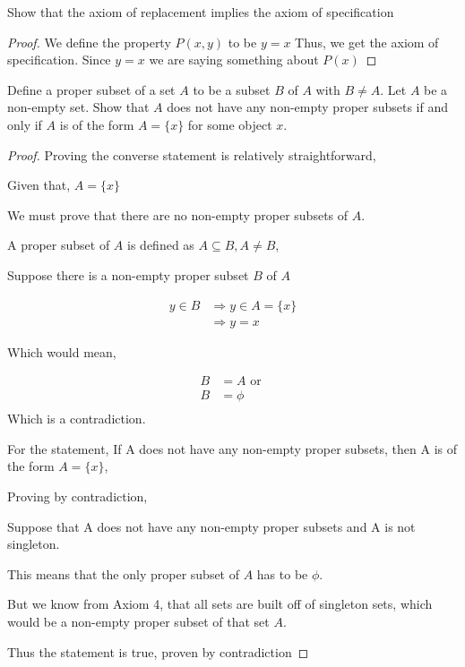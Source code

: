 \documentclass[11pt]{report}
\begin{document}
\begin{prop}
	Show that the axiom of replacement implies the axiom of specification
\end{prop}
\begin{proof}
	We define the property $P(x,y)$ to be $y=x$ Thus, we get the axiom of specification.
	Since $y=x$ we are saying something about $P(x)$
\end{proof}
\begin{prop}
	Define a proper subset of a set $A$ to be a subset $B$ of $A$ with $B \neq A$. Let $A$ be a non-empty set. Show that $A$ does not have any non-empty proper subsets if and only if $A$ is of the form $A = \{x\}$ for some object $x$.
\end{prop}
\begin{proof}

	Proving the converse statement is relatively straightforward,

	Given that,
	$A = \{x\}$

	We must prove that there are no non-empty proper subsets of $A$.

	A proper subset of $A$ is defined as $A \subseteq B, A \neq B$,

	Suppose there is a non-empty proper subset $B$ of $A$

	\begin{align*}
		y \in B & \Rightarrow y \in A = \{x\} \\
		        & \Rightarrow y = x
	\end{align*}

	Which would mean,

	\begin{align*}
		B & = A \text{ or } \\
		B & = \phi          \\
	\end{align*}
	Which is a contradiction.

	For the statement,
	If A does not have any non-empty proper subsets, then A is of the form $A = \{x\}$,

	Proving by contradiction,

	Suppose that A does not have any non-empty proper subsets and A is not singleton.

	This means that the only proper subset of $A$ has to be $\phi$.

	But we know from Axiom 4, that all sets are built off of singleton sets, which would be a non-empty proper subset of that set $A$.

	Thus the statement is true, proven by contradiction
\end{proof}
\end{document}
